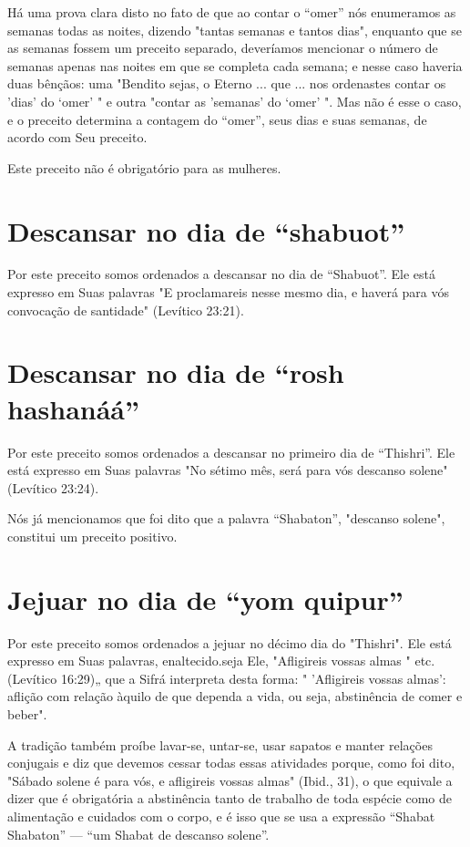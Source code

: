 Há uma prova clara disto no fato de que ao contar o ``omer'' nós
enumeramos as semanas todas as noites, dizendo "tantas semanas e tantos
dias", enquanto que se as semanas fossem um preceito separado,
deveríamos men­cionar o número de semanas apenas nas noites em que se
completa cada sema­na; e nesse caso haveria duas bênçãos: uma "Bendito
sejas, o Eterno ... que ... nos ordenastes contar os 'dias' do `omer' "
e outra "contar as 'semanas' do `omer' ". Mas não é esse o caso, e o
preceito determina a contagem do ``omer'', seus dias e suas semanas, de
acordo com Seu preceito.

Este preceito não é obrigatório para as mulheres.

\section{Descansar no dia de ``shabuot''}

Por este preceito somos ordenados a descansar no dia de ``Shabuot''. Ele
está expresso em Suas palavras "E proclamareis nesse mesmo dia, e haverá
para vós convocação de santidade" (Levítico 23:21).

\section{Descansar no dia de ``rosh hashanáá''}

Por este preceito somos ordenados a descansar no primeiro dia de
``Thishri''. Ele está expresso em Suas palavras "No sétimo mês, será para
vós descanso solene" (Levítico 23:24).

Nós já mencionamos que foi dito que a palavra ``Shabaton'', "des­canso
solene", constitui um preceito positivo.

\section{Jejuar no dia de ``yom quipur''}

Por este preceito somos ordenados a jejuar no décimo dia do "This­hri".
Ele está expresso em Suas palavras, enaltecido.seja
Ele, "Afligireis vossas almas " etc. (Levítico 16:29)„ que a Sifrá
interpreta desta forma: " 'Afligireis vossas 
almas': aflição com relação àquilo de que dependa a vida, ou seja,
abstinên­cia de comer e beber".

A tradição também proíbe lavar-se, untar-se, usar sapatos e manter
relações conjugais e diz que devemos cessar todas essas atividades
porque, co­mo foi dito, "Sábado solene é para vós, e afligireis vossas
almas" (Ibid., 31), o que equivale a dizer que é obrigatória a
abstinência tanto de trabalho de toda espécie como de alimentação e
cuidados com o corpo, e é isso que se usa a expressão ``Shabat Shabaton''
--- ``um Shabat de descanso solene''.

